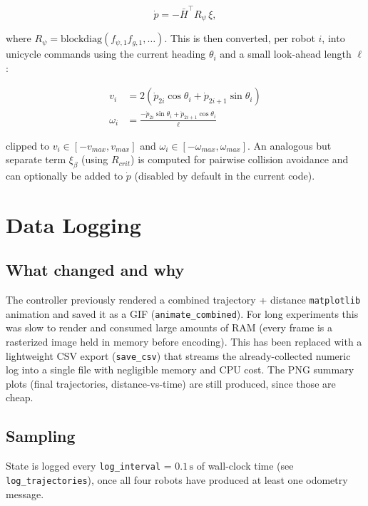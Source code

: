 \documentclass[11pt]{article}
\begin{document}
\begin{equation}
    \dot{p} = -\bar{H}^\top R_\psi\, \xi,
\end{equation}

where $R_\psi = \mathrm{blockdiag}(f_{\psi,1} f_{g,1}, \dots)$. This is then
converted, per robot $i$, into unicycle commands using the current heading
$\theta_i$ and a small look-ahead length $\ell$:

\begin{align}
    v_i &= 2\left(\dot{p}_{2i}\cos\theta_i + \dot{p}_{2i+1}\sin\theta_i\right) \\
    \omega_i &= \frac{-\dot{p}_{2i}\sin\theta_i + \dot{p}_{2i+1}\cos\theta_i}{\ell}
\end{align}

clipped to $v_i \in [-v_{max}, v_{max}]$ and $\omega_i \in [-\omega_{max},
\omega_{max}]$. An analogous but separate term $\xi_\beta$ (using
$R_{crit}$) is computed for pairwise collision avoidance and can optionally be
added to $\dot p$ (disabled by default in the current code).

\section{Data Logging}

\subsection{What changed and why}

The controller previously rendered a combined trajectory + distance
\texttt{matplotlib} animation and saved it as a GIF
(\texttt{animate\_combined}). For long experiments this was slow to render
and consumed large amounts of RAM (every frame is a rasterized image held in
memory before encoding). This has been replaced with a lightweight CSV
export (\texttt{save\_csv}) that streams the already-collected numeric log
into a single file with negligible memory and CPU cost. The PNG summary
plots (final trajectories, distance-vs-time) are still produced, since those
are cheap.

\subsection{Sampling}

State is logged every \texttt{log\_interval} = $0.1\,\text{s}$ of wall-clock
time (see \texttt{log\_trajectories}), once all four robots have produced at
least one odometry message.
\end{document}
